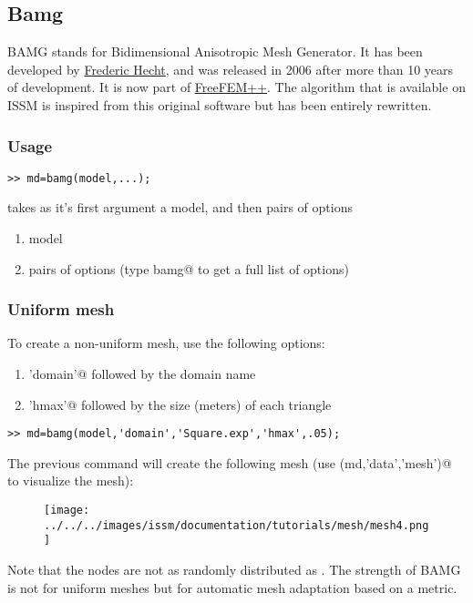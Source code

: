 \subsection{Bamg}%
BAMG stands for Bidimensional Anisotropic Mesh Generator. It has been developed by \href{http://www.ann.jussieu.fr/hecht/}{Frederic Hecht}, and was released in 2006 after more than 10 years of development. It is now part of \href{http://www.freefem.org/ff++/}{FreeFEM++}. The algorithm that is available on ISSM is inspired from this original software but has been entirely rewritten.
\subsubsection{Usage}%
\begin{verbatim}>> md=bamg(model,...);\end{verbatim}
\verb@bamg@ takes as it's first argument a model, and then pairs of options
\begin{enumerate}
	\item model
	\item pairs of options (type \verb@help bamg@ to get a full list of options)
\end{enumerate}
\subsubsection{Uniform mesh}%
To create a non-uniform mesh, use the following options:
\begin{enumerate}
	\item \verb@'domain'@ followed by the domain name
	\item \verb@'hmax'@ followed by the size (meters) of each triangle
\end{enumerate}
\begin{verbatim}>> md=bamg(model,'domain','Square.exp','hmax',.05);\end{verbatim}
The previous command will create the following mesh (use \verb@plotmodel(md,'data','mesh')@ to visualize the mesh):
\begin{figure}[H]
	\begin{center}
		\texttt{[image: ../../../images/issm/documentation/tutorials/mesh/mesh4.png]}
	\end{center}
\end{figure}
Note that the nodes are not as randomly distributed as \verb@triangle@. The strength of BAMG is not for uniform meshes but for automatic mesh adaptation based on a metric.
